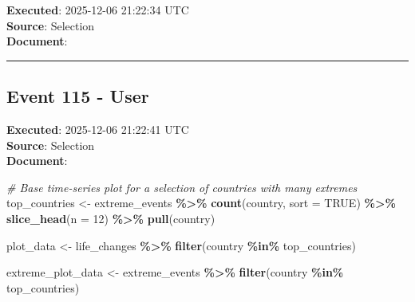 \documentclass[
  11pt,
]{article}
\newenvironment{Shaded}{\begin{snugshade}}{\end{snugshade}}
\newcommand{\AttributeTok}[1]{\textcolor[rgb]{0.13,0.29,0.53}{#1}}
\newcommand{\CommentTok}[1]{\textcolor[rgb]{0.56,0.35,0.01}{\textit{#1}}}
\newcommand{\ConstantTok}[1]{\textcolor[rgb]{0.56,0.35,0.01}{#1}}
\newcommand{\DecValTok}[1]{\textcolor[rgb]{0.00,0.00,0.81}{#1}}
\newcommand{\FloatTok}[1]{\textcolor[rgb]{0.00,0.00,0.81}{#1}}
\newcommand{\FunctionTok}[1]{\textcolor[rgb]{0.13,0.29,0.53}{\textbf{#1}}}
\newcommand{\NormalTok}[1]{#1}
\newcommand{\OtherTok}[1]{\textcolor[rgb]{0.56,0.35,0.01}{#1}}
\newcommand{\SpecialCharTok}[1]{\textcolor[rgb]{0.81,0.36,0.00}{\textbf{#1}}}
\begin{document}
\textbf{Executed}: 2025-12-06 21:22:34 UTC\\
\textbf{Source}: Selection\\
\textbf{Document}:

\begin{Shaded}
\end{Shaded}

\begin{center}\rule{0.5\linewidth}{0.5pt}\end{center}

\subsection{Event 115 - User}\label{event-115---user}

\textbf{Executed}: 2025-12-06 21:22:41 UTC\\
\textbf{Source}: Selection\\
\textbf{Document}:

\begin{Shaded}
\begin{Highlighting}[]
\CommentTok{\# Base time{-}series plot for a selection of countries with many extremes}
\NormalTok{top\_countries }\OtherTok{\textless{}{-}}\NormalTok{ extreme\_events }\SpecialCharTok{\%\textgreater{}\%}
  \FunctionTok{count}\NormalTok{(country, }\AttributeTok{sort =} \ConstantTok{TRUE}\NormalTok{) }\SpecialCharTok{\%\textgreater{}\%}
  \FunctionTok{slice\_head}\NormalTok{(}\AttributeTok{n =} \DecValTok{12}\NormalTok{) }\SpecialCharTok{\%\textgreater{}\%}
  \FunctionTok{pull}\NormalTok{(country)}

\NormalTok{plot\_data }\OtherTok{\textless{}{-}}\NormalTok{ life\_changes }\SpecialCharTok{\%\textgreater{}\%}
  \FunctionTok{filter}\NormalTok{(country }\SpecialCharTok{\%in\%}\NormalTok{ top\_countries)}

\NormalTok{extreme\_plot\_data }\OtherTok{\textless{}{-}}\NormalTok{ extreme\_events }\SpecialCharTok{\%\textgreater{}\%}
  \FunctionTok{filter}\NormalTok{(country }\SpecialCharTok{\%in\%}\NormalTok{ top\_countries)}
\end{Highlighting}
\end{Shaded}
\end{document}
